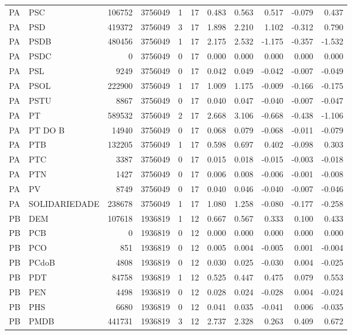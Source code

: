 \begin{landscape}
\begin{longtable}{llrrrrrrrrr}
PA & PSC & 106752 & 3756049 & 1 & 17 & 0.483 & 0.563 & 0.517 & -0.079 & 0.437 \\
PA & PSD & 419372 & 3756049 & 3 & 17 & 1.898 & 2.210 & 1.102 & -0.312 & 0.790 \\
PA & PSDB & 480456 & 3756049 & 1 & 17 & 2.175 & 2.532 & -1.175 & -0.357 & -1.532 \\
PA & PSDC & 0 & 3756049 & 0 & 17 & 0.000 & 0.000 & 0.000 & 0.000 & 0.000 \\
PA & PSL & 9249 & 3756049 & 0 & 17 & 0.042 & 0.049 & -0.042 & -0.007 & -0.049 \\
PA & PSOL & 222900 & 3756049 & 1 & 17 & 1.009 & 1.175 & -0.009 & -0.166 & -0.175 \\
PA & PSTU & 8867 & 3756049 & 0 & 17 & 0.040 & 0.047 & -0.040 & -0.007 & -0.047 \\
PA & PT & 589532 & 3756049 & 2 & 17 & 2.668 & 3.106 & -0.668 & -0.438 & -1.106 \\
PA & PT DO B & 14940 & 3756049 & 0 & 17 & 0.068 & 0.079 & -0.068 & -0.011 & -0.079 \\
PA & PTB & 132205 & 3756049 & 1 & 17 & 0.598 & 0.697 & 0.402 & -0.098 & 0.303 \\
PA & PTC & 3387 & 3756049 & 0 & 17 & 0.015 & 0.018 & -0.015 & -0.003 & -0.018 \\
PA & PTN & 1427 & 3756049 & 0 & 17 & 0.006 & 0.008 & -0.006 & -0.001 & -0.008 \\
PA & PV & 8749 & 3756049 & 0 & 17 & 0.040 & 0.046 & -0.040 & -0.007 & -0.046 \\
PA & SOLIDARIEDADE & 238678 & 3756049 & 1 & 17 & 1.080 & 1.258 & -0.080 & -0.177 & -0.258 \\
PB & DEM & 107618 & 1936819 & 1 & 12 & 0.667 & 0.567 & 0.333 & 0.100 & 0.433 \\
PB & PCB & 0 & 1936819 & 0 & 12 & 0.000 & 0.000 & 0.000 & 0.000 & 0.000 \\
PB & PCO & 851 & 1936819 & 0 & 12 & 0.005 & 0.004 & -0.005 & 0.001 & -0.004 \\
PB & PCdoB & 4808 & 1936819 & 0 & 12 & 0.030 & 0.025 & -0.030 & 0.004 & -0.025 \\
PB & PDT & 84758 & 1936819 & 1 & 12 & 0.525 & 0.447 & 0.475 & 0.079 & 0.553 \\
PB & PEN & 4498 & 1936819 & 0 & 12 & 0.028 & 0.024 & -0.028 & 0.004 & -0.024 \\
PB & PHS & 6680 & 1936819 & 0 & 12 & 0.041 & 0.035 & -0.041 & 0.006 & -0.035 \\
PB & PMDB & 441731 & 1936819 & 3 & 12 & 2.737 & 2.328 & 0.263 & 0.409 & 0.672 \\

\end{longtable}
\end{landscape}

